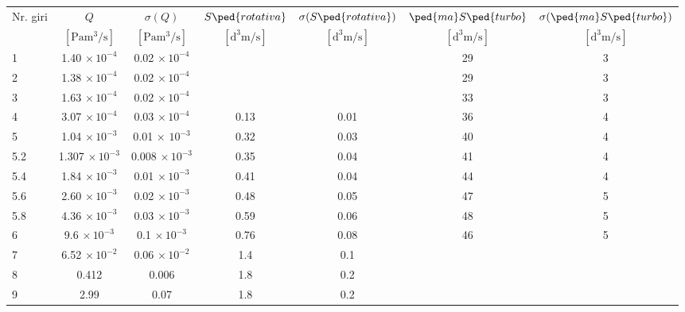 \begin{table}
    \begin{tabular}{l c c c c c c}
        \toprule
        Nr. giri & $Q$ & $\sigma (Q)$ & $S\ped{rotativa}$ & $\sigma (S\ped{rotativa})$ & $\ped{ma}S\ped{turbo}$ & $\sigma (\ped{ma}S\ped{turbo})$ \\

        & $[\si{\Pa\cubic\meter\per\second}]$ & $[\si{\Pa\cubic\meter\per\second}]$ &
        $[\si{\cubic\deci\meter\per\second}]$ & $[\si{\cubic\deci\meter\per\second}]$ &
        $[\si{\cubic\deci\meter\per\second}]$ & $[\si{\cubic\deci\meter\per\second}]$ \\

        \midrule
        1   & 1.40  $\times \, 10^{-4}$ & 0.02 $\times \, 10^{-4}$    &      &      & 29 & 3 \\
        2   & 1.38  $\times \, 10^{-4}$ & 0.02 $\times \, 10^{-4}$    &      &      & 29 & 3 \\
        3   & 1.63  $\times \, 10^{-4}$ & 0.02 $\times \, 10^{-4}$    &      &      & 33 & 3 \\
        4   & 3.07  $\times \, 10^{-4}$ & 0.03 $\times \, 10^{-4}$    & 0.13 & 0.01 & 36 & 4 \\
        5   & 1.04  $\times \, 10^{-3}$ & 0.01 $\times \, \, 10^{-3}$ & 0.32 & 0.03 & 40 & 4 \\
        5.2 & 1.307 $\times \, 10^{-3}$ & 0.008 $\times \, 10^{-3}$   & 0.35 & 0.04 & 41 & 4 \\
        5.4 & 1.84  $\times \, 10^{-3}$ & 0.01 $\times \, 10^{-3}$    & 0.41 & 0.04 & 44 & 4 \\
        5.6 & 2.60  $\times \, 10^{-3}$ & 0.02 $\times \, 10^{-3}$    & 0.48 & 0.05 & 47 & 5 \\
        5.8 & 4.36  $\times \, 10^{-3}$ & 0.03 $\times \, 10^{-3}$    & 0.59 & 0.06 & 48 & 5 \\
        6   & 9.6   $\times \, 10^{-3}$ & 0.1 $\times \, 10^{-3}$     & 0.76 & 0.08 & 46 & 5 \\
        7   & 6.52  $\times \, 10^{-2}$ & 0.06 $\times \, 10^{-2}$    & 1.4  & 0.1  &    &   \\
        8   & 0.412                     & 0.006                       & 1.8  & 0.2  &    &   \\
        9   & 2.99                      & 0.07                        & 1.8  & 0.2  &    &   \\
        \bottomrule
    \end{tabular}
\end{table}
